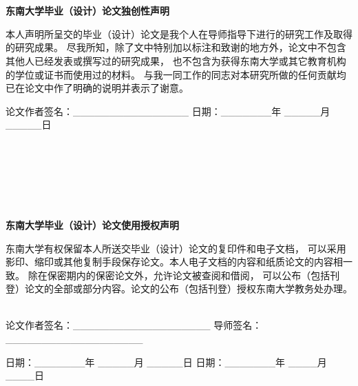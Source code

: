 
\renewcommand{\baselinestretch}{1.25} %

\newpage
\hei\xiaoer
~\\
~\\

\begin{center}
    \textbf{东南大学毕业（设计）论文独创性声明}
\end{center}

\hspace{21pt}
\song\xiaosi

本人声明所呈交的毕业（设计）论文是我个人在导师指导下进行的研究工作及取得的研究成果。
尽我所知，除了文中特别加以标注和致谢的地方外，论文中不包含其他人已经发表或撰写过的研究成果，
也不包含为获得东南大学或其它教育机构的学位或证书而使用过的材料。
与我一同工作的同志对本研究所做的任何贡献均已在论文中作了明确的说明并表示了谢意。

\hspace{18pt}

\setlength{\parindent}{4em}

{论文作者签名：\_\_\_\_\_\_\_\_\_\_\_\_\_\_\_\_ \vspace{1.5em} 
日期：\_\_\_\_\_\_\_年 \_\_\_\_\_月 \_\_\_\_\_日}

\setlength{\parindent}{2em}
~\\~\\~\\~\\~\\

\begin{center}
    \hei\xiaoer
    \textbf{东南大学毕业（设计）论文使用授权声明}
\end{center}

东南大学有权保留本人所送交毕业（设计）论文的复印件和电子文档，
可以采用影印、缩印或其他复制手段保存论文。本人电子文档的内容和纸质论文的内容相一致。
除在保密期内的保密论文外，允许论文被查阅和借阅，
可以公布（包括刊登）论文的全部或部分内容。论文的公布（包括刊登）授权东南大学教务处办理。

~\\

论文作者签名：\_\_\_\_\_\_\_\_\_\_\_\_\_\_\_\_\_\_\_  \hspace{1.5em} 导师签名：\_\_\_\_\_\_\_\_\_\_\_\_\_\_\_\_\_\_\_

日期：\_\_\_\_\_\_\_年 \_\_\_\_\_月 \_\_\_\_\_日 \hspace{2.2em} 日期：\_\_\_\_\_\_\_年 \_\_\_\_月 \_\_\_\_日
\thispagestyle{empty}